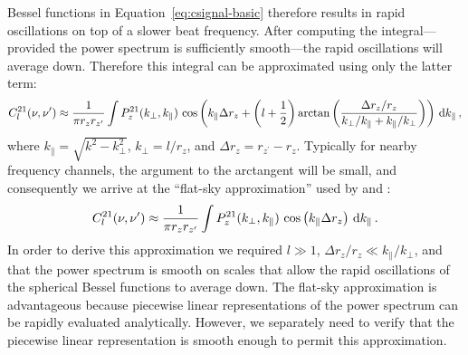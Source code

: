 \begin{bibunit}
Bessel functions in Equation~\ref{eq:csignal-basic} therefore results in rapid oscillations on top
of a slower beat frequency. After computing the integral---provided the power spectrum is
sufficiently smooth---the rapid oscillations will average down. Therefore this integral can be
approximated using only the latter term:
\begin{equation}\label{eq:csignal-beats}
    C^{21}_l(\nu, \nu^\prime) \approx
        \frac{1}{\pi r_z r_{z^\prime}}
        \int
        P_z^{21}(k_\perp, k_\parallel) \,
        \cos\left(
            k_\parallel \Delta r_z
            + \left(l+\frac{1}{2}\right) \arctan\left(
                \frac{\Delta r_z/r_z}{k_\perp/k_\parallel+k_\parallel/k_\perp}
            \right)
        \right)
        \, {\textrm d} k_\parallel\,,
\end{equation}
where $k_\parallel = \sqrt{k^2 - k_\perp^2}$, $k_\perp = l/r_z$, and $\Delta r_z = r_{z^\prime} -
r_z$. Typically for nearby frequency channels, the argument to the arctangent will be small, and
consequently we arrive at the ``flat-sky approximation'' used by \citet{2005MNRAS.356.1519B} and
\citet{2007MNRAS.378..119D}:
\begin{equation}
    C^{21}_l(\nu, \nu^\prime) \approx
        \frac{1}{\pi r_z r_{z^\prime}}
        \int
        P_z^{21}(k_\perp, k_\parallel) \,
        \cos\left(k_\parallel \Delta r_z\right)
        \, {\textrm d} k_\parallel\,.
\end{equation}
In order to derive this approximation we required $l\gg 1$, $\Delta r_z/r_z \ll
k_\parallel/k_\perp$, and that the power spectrum is smooth on scales that allow the rapid
oscillations of the spherical Bessel functions to average down.  The flat-sky approximation is
advantageous because piecewise linear representations of the power spectrum can be rapidly evaluated
analytically. However, we separately need to verify that the piecewise linear representation is
smooth enough to permit this approximation.

\end{bibunit}

